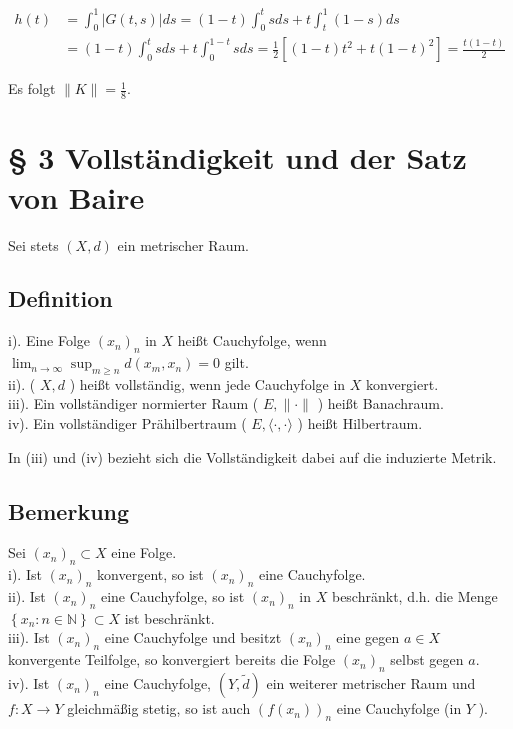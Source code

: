 \documentclass[10pt, letterpaper]{article}
\begin{document}
$$
\begin{aligned}
h(t) & =\int_{0}^{1}|G(t, s)| d s=(1-t) \int_{0}^{t} s d s+t \int_{t}^{1}(1-s) d s \\
& =(1-t) \int_{0}^{t} s d s+t \int_{0}^{1-t} s d s=\frac{1}{2}\left[(1-t) t^{2}+t(1-t)^{2}\right]=\frac{t(1-t)}{2}
\end{aligned}
$$

Es folgt $\|K\|=\frac{1}{8}$.

\section*{§ 3 Vollständigkeit und der Satz von Baire}
Sei stets $(X, d)$ ein metrischer Raum.

\subsection*{Definition}
i). Eine Folge $\left(x_{n}\right)_{n}$ in $X$ heißt Cauchyfolge, wenn $\lim _{n \rightarrow \infty} \sup _{m \geq n} d\left(x_{m}, x_{n}\right)=0$ gilt.\\
ii). ( $X, d$ ) heißt vollständig, wenn jede Cauchyfolge in $X$ konvergiert.\\
iii). Ein vollständiger normierter Raum ( $E,\|\cdot\|$ ) heißt Banachraum.\\
iv). Ein vollständiger Prähilbertraum ( $E,\langle\cdot, \cdot\rangle$ ) heißt Hilbertraum.

In (iii) und (iv) bezieht sich die Vollständigkeit dabei auf die induzierte Metrik.

\subsection*{Bemerkung}
Sei $\left(x_{n}\right)_{n} \subset X$ eine Folge.\\
i). Ist $\left(x_{n}\right)_{n}$ konvergent, so ist $\left(x_{n}\right)_{n}$ eine Cauchyfolge.\\
ii). Ist $\left(x_{n}\right)_{n}$ eine Cauchyfolge, so ist $\left(x_{n}\right)_{n}$ in $X$ beschränkt, d.h. die Menge $\left\{x_{n}: n \in \mathbb{N}\right\} \subset X$ ist beschränkt.\\
iii). Ist $\left(x_{n}\right)_{n}$ eine Cauchyfolge und besitzt $\left(x_{n}\right)_{n}$ eine gegen $a \in X$ konvergente Teilfolge, so konvergiert bereits die Folge $\left(x_{n}\right)_{n}$ selbst gegen $a$.\\
iv). Ist $\left(x_{n}\right)_{n}$ eine Cauchyfolge, $(Y, \tilde{d})$ ein weiterer metrischer Raum und $f: X \rightarrow Y$ gleichmäßig stetig, so ist auch $\left(f\left(x_{n}\right)\right)_{n}$ eine Cauchyfolge (in $Y$ ).
\end{document}

